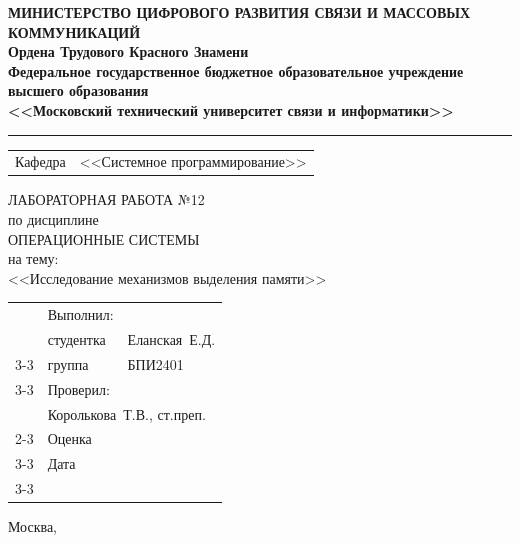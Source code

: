 \thispagestyle{empty}

\begin{center}
	\textbf{МИНИСТЕРСТВО ЦИФРОВОГО РАЗВИТИЯ СВЯЗИ И МАССОВЫХ КОММУНИКАЦИЙ} \\
	\textbf{Ордена Трудового Красного Знамени \\
		Федеральное государственное бюджетное образовательное учреждение высшего образования \\
		<<Московский технический университет связи и информатики>>}
\end{center}
\rule{\linewidth}{1pt}

\vspace{0.3em}

\begin{center}
	\begin{tabularx}{0.6\textwidth}{p{1.2cm}X}
		Кафедра & \quad <<Системное программирование>> \\%
	\end{tabularx}
\end{center}

\vspace{10em}

\begin{center}
	\Large
	ЛАБОРАТОРНАЯ РАБОТА №12 \\
	\large
	по дисциплине \\
	ОПЕРАЦИОННЫЕ СИСТЕМЫ \\
	на тему: \\
	<<Исследование механизмов выделения памяти>>
\end{center}

\vspace{4em}

\renewcommand{\arraystretch}{1.1}
\begin{tabularx}{\textwidth}{p{10cm}p{2cm}p{3cm}}
	& Выполнил: & \\
	& студентка & Еланская~Е.Д. \\\cline{3-3} 
	& группа & БПИ2401 \\\cline{3-3} 
	& Проверил: &  \\
	& \multicolumn{2}{l}{Королькова~Т.В., ст.преп.} \\\cline{2-3}
	& Оценка & \\\cline{3-3} 
	& Дата & \\\cline{3-3} 
\end{tabularx}

\vspace{5em}

\begin{center}
	Москва,~\the\year
\end{center}
\clearpage

